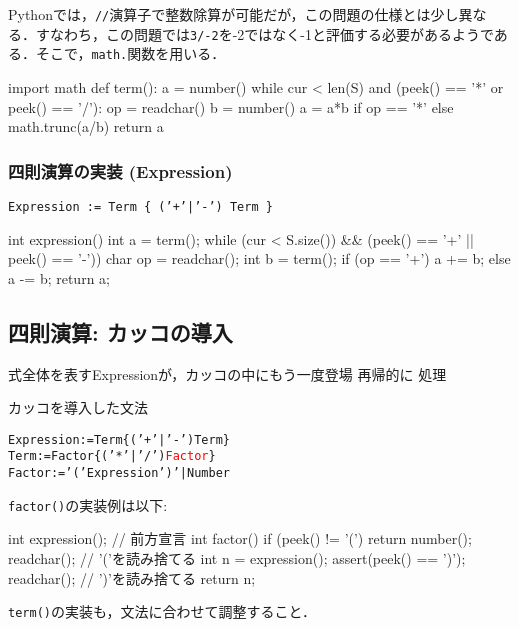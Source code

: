 Pythonでは，\texttt{//}演算子で整数除算が可能だが，この問題の仕様とは少し異なる．すなわち，この問題では\texttt{3/-2}を-2ではなく-1と評価する必要があるようである．そこで，\texttt{math.}関数を用いる．
\begin{pybox}[emph={term},emph={[2]number,*,/}]
import math
def term():
    a = number()
    while cur < len(S) and (peek() == '*' or peek() == '/'):
        op = readchar()
        b = number()
        a = a*b if op == '*' else math.trunc(a/b)
    return a
\end{pybox}
  
\subsubsection{四則演算の実装 (Expression)}
\texttt{\textcolor{ired}{Expression := Term \{ ('+'|'-') Term \}}}

  \begin{cbox}[emph={expression},emph={[2]term,+,-}]
int expression() {
  int a = term();
  while (cur < S.size())
      && (peek() == '+' || peek() == '-')) {
    char op = readchar();
    int b = term();
    if (op == '+') a += b; else a -= b;
  }
  return a;
}
\end{cbox}

\subsection{四則演算: カッコの導入}
式全体を表すExpressionが，カッコの中にもう一度登場 \dingright 再帰的に
処理

\begin{itembox}[l]{カッコを導入した文法}
  \begin{alltt}
Expression := Term \{ ('+'|'-') Term \}
Term := \textcolor{ired}{Factor} \{ ('*'|'/') \textcolor{red}{Factor} \}
\textcolor{ired}{Factor := '(' Expression ')' | Number}
\end{alltt}
\end{itembox}

\texttt{factor()}の実装例は以下:
  \begin{cbox}[emph={factor},emph={[2]number,expression}]
int expression(); // 前方宣言
int factor() {
  if (peek() != '(') return number();
  readchar(); // '('を読み捨てる
  int n = expression();
  assert(peek() == ')');
  readchar(); // ')'を読み捨てる
  return n;
}
\end{cbox}

\texttt{term()}の実装も，文法に合わせて調整すること．

